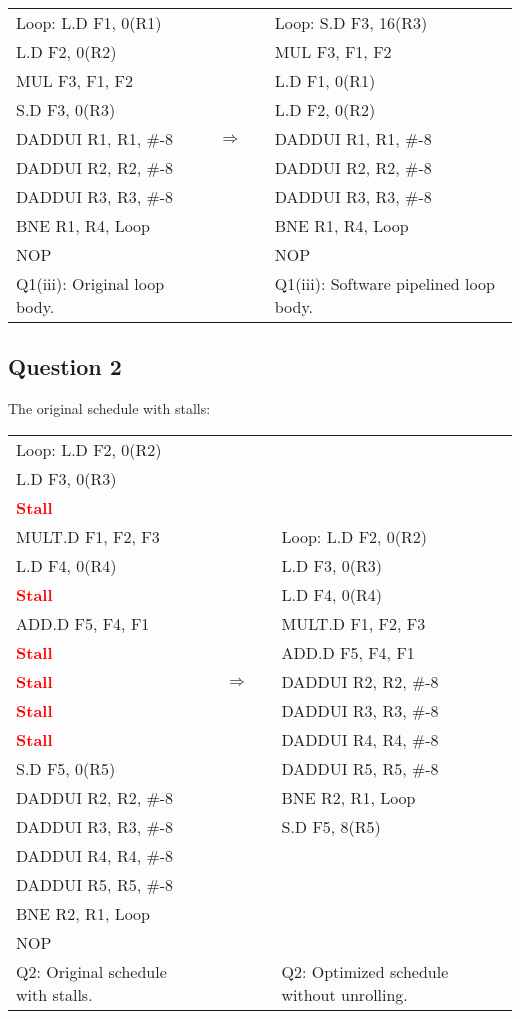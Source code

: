 \documentclass[11pt]{article}
\newcommand{\q}[1]{\subsection*{Question {#1}}}
\newcommand{\code}[1]{\textsf{#1}}
\newcommand{\stall}{\textcolor{red}{\textbf{Stall}}}
\begin{document}
\begin{table}[h]
\center
\begin{tabular}{lcccl}
	  \code{Loop:} \code{L.D F1, 0(R1)} & & & &  \code{Loop:} \code{S.D F3, 16(R3)} \\
	 \code{L.D F2, 0(R2)}  & & & & \code{MUL F3, F1, F2}\\
	 \code{MUL F3, F1, F2}  & & & & \code{L.D F1, 0(R1)} \\
	 \code{S.D F3, 0(R3)} & & & & \code{L.D F2, 0(R2)} \\
	 \code{DADDUI R1, R1, \#-8} & & $\Rightarrow$ & & \code{DADDUI R1, R1, \#-8} \\
	 \code{DADDUI R2, R2, \#-8} & & & & \code{DADDUI R2, R2, \#-8} \\
	 \code{DADDUI R3, R3, \#-8} & & & & \code{DADDUI R3, R3, \#-8} \\
	 \code{BNE R1, R4, Loop} & & & & \code{BNE R1, R4, Loop} \\ 
	 \code{NOP} & & & & \code{NOP} \\
	 Q1(iii): Original loop body. & & & & Q1(iii): Software pipelined loop body.
\end{tabular}
\label{tbl:q1p3}
\end{table}

\q{2} The original schedule with stalls:

\begin{table}[h]
\begin{tabular}{lcccl}
	  \code{Loop:} \code{L.D F2, 0(R2)} & & & & \\
	 \code{L.D F3, 0(R3)} & & & & \\
	 \stall & & & &\\
	 \code{MULT.D F1, F2, F3} & & & &  \code{Loop:} \code{L.D F2, 0(R2)} \\
	 \code{L.D F4, 0(R4)} & & & & \code{L.D F3, 0(R3)} \\
	 \stall & & & & \code{L.D F4, 0(R4)} \\
	 \code{ADD.D F5, F4, F1} & & & & \code{MULT.D F1, F2, F3} \\
	 \stall & & & & \code{ADD.D F5, F4, F1} \\
	 \stall & & $\Rightarrow$ & & \code{DADDUI R2, R2, \#-8} \\
	 \stall & & & & \code{DADDUI R3, R3, \#-8} \\
	 \stall & & & & \code{DADDUI R4, R4, \#-8} \\
	 \code{S.D F5, 0(R5)} & & & & \code{DADDUI R5, R5, \#-8} \\
	 \code{DADDUI R2, R2, \#-8} & & & & \code{BNE R2, R1, Loop} \\
	 \code{DADDUI R3, R3, \#-8} & & & & \code{S.D F5, 8(R5)} \\
	 \code{DADDUI R4, R4, \#-8} & & & &\\
	 \code{DADDUI R5, R5, \#-8} & & & & \\
	 \code{BNE R2, R1, Loop} & & & &\\
	 \code{NOP} & & & &\\
	 Q2: Original schedule with stalls. & & & & Q2: Optimized schedule without unrolling.
\end{tabular}
\label{tbl:q2}
\end{table}
\end{document}

